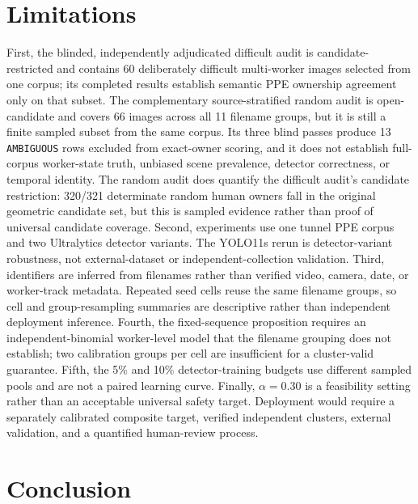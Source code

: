 \documentclass[iicol,pdflatex,sn-mathphys-num]{sn-jnl}
\begin{document}
\section{Limitations}\label{sec:limitations}

First, the blinded, independently adjudicated difficult audit is candidate-restricted and contains 60 deliberately difficult multi-worker images selected from one corpus; its completed results establish semantic PPE ownership agreement only on that subset. The complementary source-stratified random audit is open-candidate and covers 66 images across all 11 filename groups, but it is still a finite sampled subset from the same corpus. Its three blind passes produce 13 \texttt{AMBIGUOUS} rows excluded from exact-owner scoring, and it does not establish full-corpus worker-state truth, unbiased scene prevalence, detector correctness, or temporal identity. The random audit does quantify the difficult audit's candidate restriction: 320/321 determinate random human owners fall in the original geometric candidate set, but this is sampled evidence rather than proof of universal candidate coverage. Second, experiments use one tunnel PPE corpus and two Ultralytics detector variants. The YOLO11s rerun is detector-variant robustness, not external-dataset or independent-collection validation. Third, identifiers are inferred from filenames rather than verified video, camera, date, or worker-track metadata. Repeated seed cells reuse the same filename groups, so cell and group-resampling summaries are descriptive rather than independent deployment inference. Fourth, the fixed-sequence proposition requires an independent-binomial worker-level model that the filename grouping does not establish; two calibration groups per cell are insufficient for a cluster-valid guarantee. Fifth, the 5\% and 10\% detector-training budgets use different sampled pools and are not a paired learning curve. Finally, $\alpha=0.30$ is a feasibility setting rather than an acceptable universal safety target. Deployment would require a separately calibrated composite target, verified independent clusters, external validation, and a quantified human-review process.

\section{Conclusion}\label{sec:conclusion}
\end{document}
